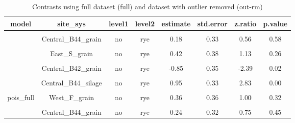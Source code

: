 \documentclass[
]{article}
\begin{document}
\begin{table}[H]

\caption{\label{tab:contrasts}Contrasts using full dataset (full) and dataset with outlier removed (out-rm)}
\centering
\begin{tabular}[t]{cccccccc}
\toprule
model & site\_sys & level1 & level2 & estimate & std.error & z.ratio & p.value\\
\midrule
\cellcolor{gray!6}{pois\_out-rm} & \cellcolor{gray!6}{Central\_B42\_grain} & \cellcolor{gray!6}{no} & \cellcolor{gray!6}{rye} & \cellcolor{gray!6}{-0.85} & \cellcolor{gray!6}{0.34} & \cellcolor{gray!6}{-2.50} & \cellcolor{gray!6}{0.01}\\
 & Central\_B44\_grain & no & rye & 0.18 & 0.33 & 0.56 & 0.58\\

\cellcolor{gray!6}{pois\_out-rm} & \cellcolor{gray!6}{Central\_B44\_silage} & \cellcolor{gray!6}{no} & \cellcolor{gray!6}{rye} & \cellcolor{gray!6}{0.95} & \cellcolor{gray!6}{0.32} & \cellcolor{gray!6}{2.96} & \cellcolor{gray!6}{0.00}\\
 & East\_S\_grain & no & rye & 0.42 & 0.38 & 1.13 & 0.26\\

\cellcolor{gray!6}{pois\_out-rm} & \cellcolor{gray!6}{West\_F\_grain} & \cellcolor{gray!6}{no} & \cellcolor{gray!6}{rye} & \cellcolor{gray!6}{0.71} & \cellcolor{gray!6}{0.38} & \cellcolor{gray!6}{1.86} & \cellcolor{gray!6}{0.06}\\
 & Central\_B42\_grain & no & rye & -0.85 & 0.35 & -2.39 & 0.02\\

\cellcolor{gray!6}{pois\_full} & \cellcolor{gray!6}{Central\_B44\_grain} & \cellcolor{gray!6}{no} & \cellcolor{gray!6}{rye} & \cellcolor{gray!6}{0.18} & \cellcolor{gray!6}{0.34} & \cellcolor{gray!6}{0.52} & \cellcolor{gray!6}{0.60}\\
 & Central\_B44\_silage & no & rye & 0.95 & 0.33 & 2.83 & 0.00\\

\cellcolor{gray!6}{pois\_full} & \cellcolor{gray!6}{East\_S\_grain} & \cellcolor{gray!6}{no} & \cellcolor{gray!6}{rye} & \cellcolor{gray!6}{0.43} & \cellcolor{gray!6}{0.39} & \cellcolor{gray!6}{1.09} & \cellcolor{gray!6}{0.28}\\
\multirow{-5}{*}{\centering\arraybackslash pois\_full} & West\_F\_grain & no & rye & 0.36 & 0.36 & 1.00 & 0.32\\
\cmidrule{1-8}
\cellcolor{gray!6}{binom\_out-rm} & \cellcolor{gray!6}{Central\_B42\_grain} & \cellcolor{gray!6}{no} & \cellcolor{gray!6}{rye} & \cellcolor{gray!6}{-0.97} & \cellcolor{gray!6}{0.34} & \cellcolor{gray!6}{-2.88} & \cellcolor{gray!6}{0.00}\\
 & Central\_B44\_grain & no & rye & 0.24 & 0.32 & 0.75 & 0.45\\


\end{tabular}
\end{table}
\end{document}
